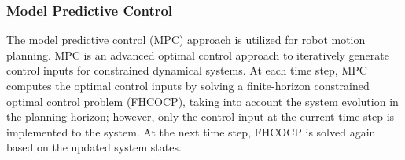 \documentclass[journal]{IEEEtran}
\newcommand{\todonote}[1]{\vspace{0px} %
	\todo[inline, color=green!30]{\textbf{[Note:]} {#1}} %
}
\begin{document}
    \subsubsection{Model Predictive Control}
	The model predictive control (MPC) approach is utilized for robot motion planning. 
    MPC is an advanced optimal control approach to iteratively generate control inputs for constrained dynamical systems.
    At each time step, MPC computes the optimal control inputs by solving a finite-horizon constrained optimal control problem (FHCOCP), taking into account the system evolution in the planning horizon; 
however, only the control input at the current time step is implemented to the system. At the next time step, FHCOCP is solved again based on the updated system states.
    
\end{document}
